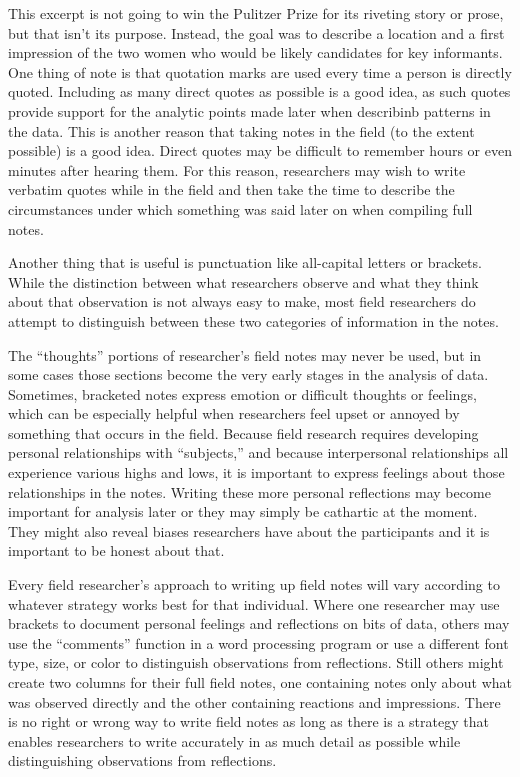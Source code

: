 This excerpt is not going to win the Pulitzer Prize for its riveting story or prose, but that isn’t its purpose. Instead, the goal was to describe a location and a first impression of the two women who would be likely candidates for key informants. One thing of note is that quotation marks are used every time a person is directly quoted. Including as many direct quotes as possible is a good idea, as such quotes provide support for the analytic points made later when describinb patterns in the data. This is another reason that taking notes in the field (to the extent possible) is a good idea. Direct quotes may be difficult to remember hours or even minutes after hearing them. For this reason, researchers may wish to write verbatim quotes while in the field and then take the time to describe the circumstances under which something was said later on when compiling full notes.

Another thing that is useful is punctuation like all-capital letters or brackets. While the distinction between what researchers observe and what they think about that observation is not always easy to make, most field researchers do attempt to distinguish between these two categories of information in the notes.

The ``thoughts'' portions of researcher's field notes may never be used, but in some cases those sections become the very early stages in the analysis of data. Sometimes, bracketed notes express emotion or difficult thoughts or feelings, which can be especially helpful when researchers feel upset or annoyed by something that occurs in the field. Because field research requires developing personal relationships with ``subjects,'' and because interpersonal relationships all experience various highs and lows, it is important to express feelings about those relationships in the notes. Writing these more personal reflections may become important for analysis later or they may simply be cathartic at the moment. They might also reveal biases researchers have about the participants and it is important to be honest about that.

Every field researcher’s approach to writing up field notes will vary according to whatever strategy works best for that individual. Where one researcher may use brackets to document personal feelings and reflections on bits of data, others may use the ``comments'' function in a word processing program or use a different font type, size, or color to distinguish observations from reflections. Still others might create two columns for their full field notes, one containing notes only about what was observed directly and the other containing reactions and impressions. There is no right or wrong way to write field notes as long as there is a strategy that enables researchers to write accurately in as much detail as possible while distinguishing observations from reflections.

